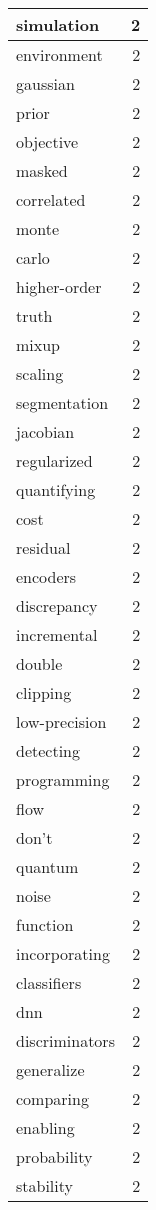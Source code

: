 \begin{table}[h]
\begin{tabular}{|l|r|}
\hline
simulation & 2 \\
\hline
environment & 2 \\
\hline
gaussian & 2 \\
\hline
prior & 2 \\
\hline
objective & 2 \\
\hline
masked & 2 \\
\hline
correlated & 2 \\
\hline
monte & 2 \\
\hline
carlo & 2 \\
\hline
higher-order & 2 \\
\hline
truth & 2 \\
\hline
mixup & 2 \\
\hline
scaling & 2 \\
\hline
segmentation & 2 \\
\hline
jacobian & 2 \\
\hline
regularized & 2 \\
\hline
quantifying & 2 \\
\hline
cost & 2 \\
\hline
residual & 2 \\
\hline
encoders & 2 \\
\hline
discrepancy & 2 \\
\hline
incremental & 2 \\
\hline
double & 2 \\
\hline
clipping & 2 \\
\hline
low-precision & 2 \\
\hline
detecting & 2 \\
\hline
programming & 2 \\
\hline
flow & 2 \\
\hline
don't & 2 \\
\hline
quantum & 2 \\
\hline
noise & 2 \\
\hline
function & 2 \\
\hline
incorporating & 2 \\
\hline
classifiers & 2 \\
\hline
dnn & 2 \\
\hline
discriminators & 2 \\
\hline
generalize & 2 \\
\hline
comparing & 2 \\
\hline
enabling & 2 \\
\hline
probability & 2 \\
\hline
stability & 2 \\

\end{tabular}
\end{table}
